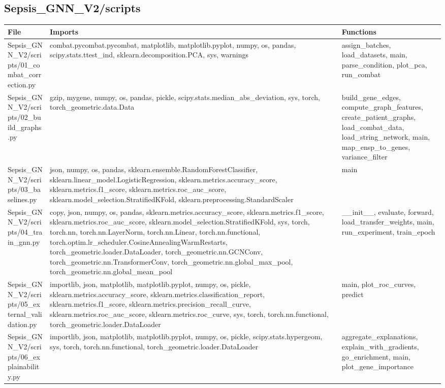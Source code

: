 \documentclass[11pt]{article}
\begin{document}
\subsection{Sepsis\_GNN\_V2/scripts}
\begin{longtable}{p{}p{}p{}}
\textbf{File} & \textbf{Imports} & \textbf{Functions} \\ \hline
Sepsis\_GNN\_V2/scripts/01\_combat\_correction.py & combat.pycombat.pycombat, matplotlib, matplotlib.pyplot, numpy, os, pandas, scipy.stats.ttest\_ind, sklearn.decomposition.PCA, sys, warnings & assign\_batches, load\_datasets, main, parse\_condition, plot\_pca, run\_combat \\
Sepsis\_GNN\_V2/scripts/02\_build\_graphs.py & gzip, mygene, numpy, os, pandas, pickle, scipy.stats.median\_abs\_deviation, sys, torch, torch\_geometric.data.Data & build\_gene\_edges, compute\_graph\_features, create\_patient\_graphs, load\_combat\_data, load\_string\_network, main, map\_ensp\_to\_genes, variance\_filter \\
Sepsis\_GNN\_V2/scripts/03\_baselines.py & json, numpy, os, pandas, sklearn.ensemble.RandomForestClassifier, sklearn.linear\_model.LogisticRegression, sklearn.metrics.accuracy\_score, sklearn.metrics.f1\_score, sklearn.metrics.roc\_auc\_score, sklearn.model\_selection.StratifiedKFold, sklearn.preprocessing.StandardScaler & main \\
Sepsis\_GNN\_V2/scripts/04\_train\_gnn.py & copy, json, numpy, os, pandas, sklearn.metrics.accuracy\_score, sklearn.metrics.f1\_score, sklearn.metrics.roc\_auc\_score, sklearn.model\_selection.StratifiedKFold, sys, torch, torch.nn, torch.nn.LayerNorm, torch.nn.Linear, torch.nn.functional, torch.optim.lr\_scheduler.CosineAnnealingWarmRestarts, torch\_geometric.loader.DataLoader, torch\_geometric.nn.GCNConv, torch\_geometric.nn.TransformerConv, torch\_geometric.nn.global\_max\_pool, torch\_geometric.nn.global\_mean\_pool & \_\_init\_\_, evaluate, forward, load\_transfer\_weights, main, run\_experiment, train\_epoch \\
Sepsis\_GNN\_V2/scripts/05\_external\_validation.py & importlib, json, matplotlib, matplotlib.pyplot, numpy, os, pickle, sklearn.metrics.accuracy\_score, sklearn.metrics.classification\_report, sklearn.metrics.f1\_score, sklearn.metrics.precision\_recall\_curve, sklearn.metrics.roc\_auc\_score, sklearn.metrics.roc\_curve, sys, torch, torch.nn.functional, torch\_geometric.loader.DataLoader & main, plot\_roc\_curves, predict \\
Sepsis\_GNN\_V2/scripts/06\_explainability.py & importlib, json, matplotlib, matplotlib.pyplot, numpy, os, pickle, scipy.stats.hypergeom, sys, torch, torch.nn.functional, torch\_geometric.loader.DataLoader & aggregate\_explanations, explain\_with\_gradients, go\_enrichment, main, plot\_gene\_importance \\
\end{longtable}
\end{document}
